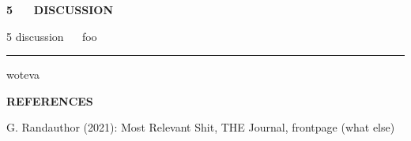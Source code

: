 \documentclass[11pt, compress, t, notes = noshow, xcolor = table, 
aspectratio = 1610]{beamer}
\newcommand{\highlight}[1]{\textcolor{highlightcol}{\textbf{#1}}}
\begin{document}

\begin{frame}{}

\Huge
\hspace{0pt}
\vfill
\textbf{\highlight{5 ~~ DISCUSSION}}
\vfill
\hspace{0pt}

\end{frame}


\LARGE
\begin{frame}{\textcolor{gray!90}{5 discussion} ~~ foo}
\normalsize
\vspace{-0.5cm}
\noindent \textcolor{gray!90}{\rule{\textwidth}{1pt}}


\medskip

woteva

\end{frame}


\begin{frame}{}

\Huge
\hspace{0pt}
\vfill
\textbf{\highlight{REFERENCES}}
\vfill
\hspace{0pt}

\end{frame}


\begin{frame}{}
\normalsize

G. Randauthor (2021): Most Relevant Shit, THE Journal, frontpage (what else)

\end{frame}


\endlecture
\end{document}
